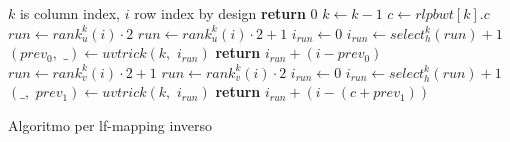 \documentclass[a4paper,12pt, oneside]{book}
\begin{document}
\begin{algorithm}[H]
  \begin{algorithmic}[1]
    \Comment $k$ is column index, $i$ row index
    \Comment by design
    \State \textbf{return} $0$
    \EndIf
    \State $k\gets k-1$
    \State $c\gets rlpbwt[k].c$
    \State $run\gets rank_u^{k}(i)\cdot 2$
    \Else
    \State $run\gets rank_u^{k}(i)\cdot 2+1$
    \EndIf
    \State $i_{run}\gets 0$
    \State $i_{run}\gets select_h^{k}(run)+1$
    \EndIf
    \State $(prev_0,\,\,\_)\gets uvtrick(k,\,\,i_{run})$
    \State \textbf{return} $i_{run}+(i-prev_0)$
    \Else
    \State $run\gets rank_v^{k}(i)\cdot 2+1$
    \Else
    \State $run\gets rank_v^{k}(i)\cdot 2$
    \EndIf
    \State $i_{run}\gets 0$
    \State $i_{run}\gets select_h^{k}(run)+1$
    \EndIf
    \State $(\_,\,\,prev_1)\gets uvtrick(k,\,\,i_{run})$
    \State \textbf{return} $i_{run}+(i-(c+prev_1))$
    \EndIf
    \EndFunction
  \end{algorithmic}
  \caption{Algoritmo per lf-mapping inverso}
\end{algorithm}
\end{document}
